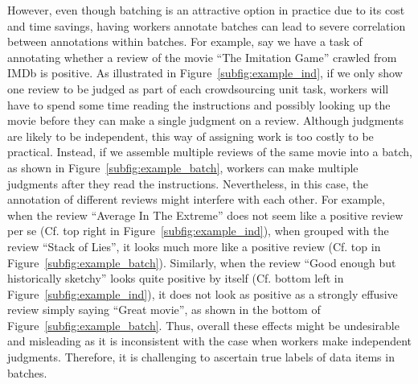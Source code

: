 However, even though batching is an attractive option in practice
due to its cost and time savings, having workers annotate batches can lead to severe correlation between annotations within batches.  
For example, say we have a task of annotating whether a review of the movie ``The Imitation Game'' crawled from IMDb is positive.
As illustrated in Figure~\ref{subfig:example_ind}, if we only show one review to be judged as part of each crowdsourcing unit task,
workers will have to spend some time reading the instructions
and possibly looking up the movie 
before they can make a single judgment on a review.
Although judgments are likely to be independent, 
this way of assigning work is too costly to be practical.
Instead, if we assemble multiple reviews of the same movie into a batch, as shown in Figure~\ref{subfig:example_batch},
workers can make multiple judgments after they read the instructions.  
Nevertheless, in this case, the annotation of different reviews might interfere with each other.
For example, when the review ``Average In The Extreme'' does not seem like a positive review per se (Cf. top right in Figure~\ref{subfig:example_ind}),
when grouped with the review ``Stack of Lies'', it looks much more like a positive review (Cf. top in Figure~\ref{subfig:example_batch}).
Similarly, when the review ``Good enough but historically sketchy'' looks quite positive by itself (Cf. bottom left in Figure~\ref{subfig:example_ind}),
it does not look as positive as a strongly effusive review simply saying ``Great movie'', as shown in the bottom of Figure~\ref{subfig:example_batch}.
Thus, overall these effects might be undesirable and misleading as it is inconsistent with the case when workers make independent judgments.
Therefore, it is challenging to ascertain true labels of data items in batches.




